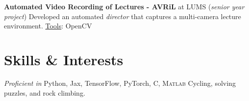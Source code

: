 \documentclass[10pt,twoside,a4paper]{article}
\newif\ifdetail
\newcommand\CPP{C\nolinebreak[4]\hspace{-.05em}\raisebox{.4ex}{\relsize{-3}{\textbf{++}}}}
\begin{document}
\textbf{Automated Video Recording of Lectures - AVRiL} at LUMS (\textit{senior year project}) \newline
Developed an automated \textit{director} that captures a multi-camera lecture environment. %
 \underline{Tools}: OpenCV%

\ifdetail
\textbf{Improvements in Google's MapReduce Architecture} at LUMS \newline
Research enabling MapReduce to run speculatively on skewed input data. (\href{https://code.google.com/p/mrplus/}{tinyurl.com/q3detyg}) \underline{Tools}: Python, \textsc{Hadoop}
\fi

\ifdetail
\textbf{Surveillance Video Compression through Foveation} as a \textit{research initiative} \newline
Researched the development of a novel H.264 encoder which assigns more bits to areas where the human visual system is more likely to foveate in surveillance footage. (\href{http://suraj.lums.edu.pk/~foveation}{http://suraj.lums.edu.pk/\(\sim\)foveation}) \underline{Tools}: \textsc{Java} Media Framework
\fi

\section{Skills \& Interests}
\textit{Proficient in} Python, Jax, TensorFlow, PyTorch, \textsc{\CPP}, \textsc{Matlab} \hspace{5mm}\textbar\hspace{5mm} Cycling, solving puzzles, and rock climbing.

\ifdetail
\end{document}
